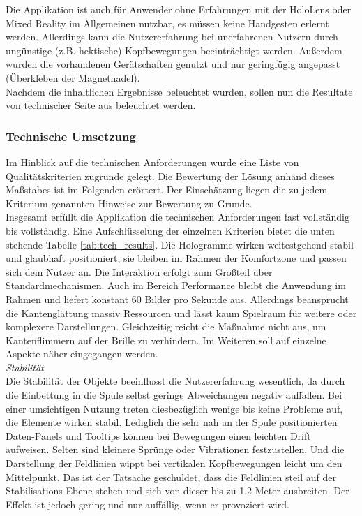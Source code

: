 Die Applikation ist auch für Anwender ohne Erfahrungen mit der HoloLens oder Mixed Reality im Allgemeinen nutzbar, es müssen keine Handgesten erlernt werden. Allerdings kann die Nutzererfahrung bei unerfahrenen Nutzern durch ungünstige (z.B. hektische) Kopfbewegungen beeinträchtigt werden. Außerdem wurden die vorhandenen Gerätschaften genutzt und nur geringfügig angepasst (Überkleben der Magnetnadel).\\

Nachdem die inhaltlichen Ergebnisse beleuchtet wurden, sollen nun die Resultate von technischer Seite aus beleuchtet werden.

\subsubsection{Technische Umsetzung}
Im Hinblick auf die technischen Anforderungen wurde eine Liste von Qualitätskriterien zugrunde gelegt. Die Bewertung der Lösung anhand dieses Maßstabes ist im Folgenden erörtert. Der Einschätzung liegen die zu jedem Kriterium genannten Hinweise zur Bewertung zu Grunde.\\

Insgesamt erfüllt die Applikation die technischen Anforderungen fast vollständig bis vollständig. Eine Aufschlüsselung der einzelnen Kriterien bietet die unten stehende Tabelle \ref{tab:tech_results}. Die Hologramme wirken weitestgehend stabil und glaubhaft positioniert, sie bleiben im Rahmen der Komfortzone und passen sich dem Nutzer an. Die Interaktion erfolgt zum Großteil über Standardmechanismen. Auch im Bereich Performance bleibt die Anwendung im Rahmen und liefert konstant 60 Bilder pro Sekunde aus. Allerdings beansprucht die Kantenglättung massiv Ressourcen und lässt kaum Spielraum für weitere oder komplexere Darstellungen. Gleichzeitig reicht die Maßnahme nicht aus, um Kantenflimmern auf der Brille zu verhindern. Im Weiteren soll auf einzelne Aspekte näher eingegangen werden.\\

\textit{Stabilität}\\
Die Stabilität der Objekte beeinflusst die Nutzererfahrung wesentlich, da durch die Einbettung in die Spule selbst geringe Abweichungen negativ auffallen. Bei einer umsichtigen Nutzung treten diesbezüglich wenige bis keine Probleme auf, die Elemente wirken stabil. Lediglich die sehr nah an der Spule positionierten Daten-Panels und Tooltips können bei Bewegungen einen leichten Drift aufweisen. Selten sind kleinere Sprünge oder Vibrationen festzustellen. Und die Darstellung der Feldlinien wippt bei vertikalen Kopfbewegungen leicht um den Mittelpunkt. Das ist der Tatsache geschuldet, dass die Feldlinien steil auf der Stabilisations-Ebene stehen und sich von dieser bis zu 1,2 Meter ausbreiten. Der Effekt ist jedoch gering und nur auffällig, wenn er provoziert wird.\\
 
